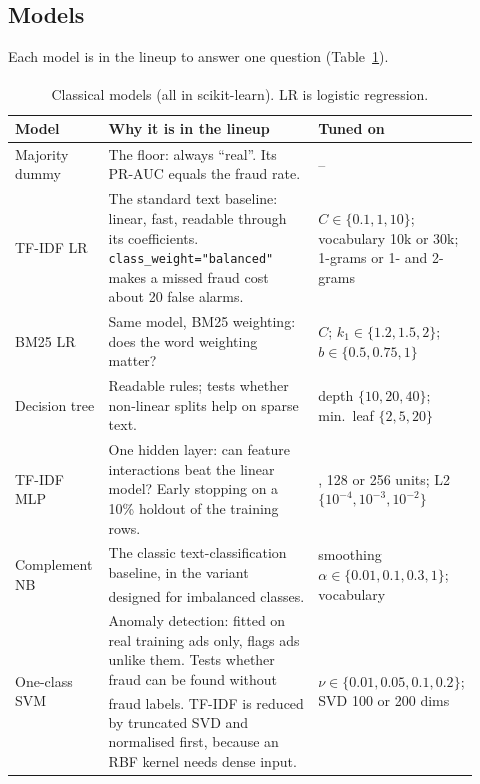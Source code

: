 \subsection{Models}

Each model is in the lineup to answer one question (Table~\ref{tab:models}).

\begin{table}[tb]
\centering
\small
\begin{tabular}{>{\raggedright\arraybackslash}p{0.17\linewidth}>{\raggedright\arraybackslash}p{0.44\linewidth}>{\raggedright\arraybackslash}p{0.31\linewidth}}
\toprule
\textbf{Model} & \textbf{Why it is in the lineup} & \textbf{Tuned on} \\
\midrule
Majority dummy & The floor: always ``real''. Its PR-AUC equals the fraud rate. & -- \\
TF-IDF LR & The standard text baseline: linear, fast, readable through its coefficients.
  \texttt{class\_weight="balanced"} makes a missed fraud cost about 20 false alarms. &
  $C \in \{0.1, 1, 10\}$; vocabulary 10k or 30k; 1-grams or 1- and 2-grams \\
BM25 LR & Same model, BM25 weighting: does the word weighting matter? &
  $C$; $k_1 \in \{1.2, 1.5, 2\}$; $b \in \{0.5, 0.75, 1\}$ \\
Decision tree & Readable rules; tests whether non-linear splits help on sparse text. &
  depth $\{10, 20, 40\}$; min.\ leaf $\{2, 5, 20\}$ \\
TF-IDF MLP & One hidden layer: can feature interactions beat the linear model? Early stopping
  on a 10\% holdout of the training rows. & 64, 128 or 256 units; L2 $\{10^{-4}, 10^{-3}, 10^{-2}\}$ \\
Complement NB & The classic text-classification baseline, in the variant designed for imbalanced
  classes\textsuperscript{\cite{rennie2003}}. & smoothing $\alpha \in \{0.01, 0.1, 0.3, 1\}$; vocabulary \\
One-class SVM & Anomaly detection: fitted on real training ads only, flags ads unlike them. Tests
  whether fraud can be found without fraud labels\textsuperscript{\cite{scholkopf2001}}. TF-IDF is
  reduced by truncated SVD and normalised first, because an RBF kernel needs dense input. &
  $\nu \in \{0.01, 0.05, 0.1, 0.2\}$; SVD 100 or 200 dims \\
\bottomrule
\end{tabular}
\caption{Classical models (all in scikit-learn\textsuperscript{\cite{pedregosa2011}}). LR is
logistic regression.}
\label{tab:models}
\end{table}

